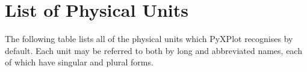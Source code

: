%
%
%
%
%



\chapter{List of Physical Units}
\label{unit_list}

The following table lists all of the physical units which PyXPlot recognises by default. Each unit may be referred to both by long and abbreviated names, each of which have singular and plural forms.

